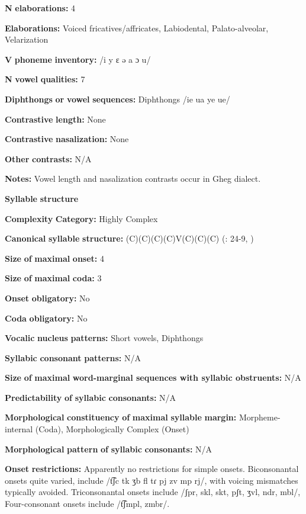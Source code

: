 \begin{styleBody}
\textbf{N} \textbf{elaborations:} 4

\textbf{Elaborations:} Voiced fricatives/affricates, Labiodental, Palato-alveolar, Velarization

\textbf{V} \textbf{phoneme} \textbf{inventory:} /i y ɛ ə a ɔ u/

\textbf{N} \textbf{vowel} \textbf{qualities:} 7

\textbf{Diphthongs} \textbf{or} \textbf{vowel} \textbf{sequences:} Diphthongs /ie ua ye ue/

\textbf{Contrastive} \textbf{length:} None

\textbf{Contrastive} \textbf{nasalization:} None

\textbf{Other} \textbf{contrasts:} N/A

\textbf{Notes:} Vowel length and nasalization contrasts occur in Gheg dialect.

\textbf{Syllable} \textbf{structure}

\textbf{Complexity} \textbf{Category:} Highly Complex

\textbf{Canonical} \textbf{syllable} \textbf{structure:} (C)(C)(C)(C)V(C)(C)(C) (\citealt{Newmark1957}: 24-9, \citealt{Klippenstein2010})

\textbf{Size} \textbf{of} \textbf{maximal} \textbf{onset:} 4

\textbf{Size} \textbf{of} \textbf{maximal} \textbf{coda:} 3

\textbf{Onset} \textbf{obligatory:} No

\textbf{Coda} \textbf{obligatory:} No

\textbf{Vocalic} \textbf{nucleus} \textbf{patterns:} Short vowels, Diphthongs

\textbf{Syllabic} \textbf{consonant} \textbf{patterns:} N/A

\textbf{Size} \textbf{of} \textbf{maximal} \textbf{word{}-marginal sequences with syllabic obstruents:} N/A

\textbf{Predictability} \textbf{of} \textbf{syllabic} \textbf{consonants:} N/A

\textbf{Morphological} \textbf{constituency} \textbf{of} \textbf{maximal} \textbf{syllable} \textbf{margin:} Morpheme-internal (Coda), Morphologically Complex (Onset)

\textbf{Morphological} \textbf{pattern} \textbf{of} \textbf{syllabic} \textbf{consonants:} N/A

\textbf{Onset} \textbf{restrictions:} Apparently no restrictions for simple onsets. Biconsonantal onsets quite varied, include /t͡ʃc tk ʒb fl tɾ pj zv mp rj/, with voicing mismatches typically avoided. Triconsonantal onsets include /ʃpr, skl, skt, pʃt, ʒvl, ndr, mbl/, Four-consonant onsets include /t͡ʃmpl, zmbr/.


\end{styleBody}
